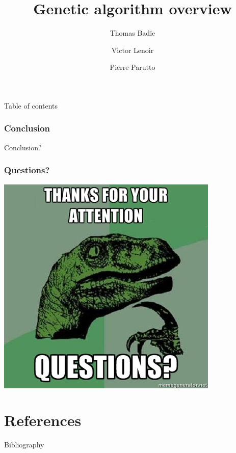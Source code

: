 \documentclass[smaller,pdf,svgnames]{beamer}
\title {Genetic algorithm overview}
\author{Thomas Badie \and Victor Lenoir \and Pierre Parutto}
\institute{LRDE\\Laboratoire de Recherche et D\'eveloppement de l'EPITA}
\begin{document}
\begin{frame}
  \maketitle
\end{frame}

\begin{frame}{Table of contents}
  \tableofcontents
\end{frame}







\begin{frame}
  \frametitle{Conclusion}
  Conclusion?
\end{frame}

\begin{frame}
  \frametitle{Questions?}

  \begin{center}
    \includegraphics[scale=0.7]{img/questions.jpg}
  \end{center}

\end{frame}

\section{References}

\begin{frame}{Bibliography}
  \footnotesize
  
  
\end{frame}
\end{document}
